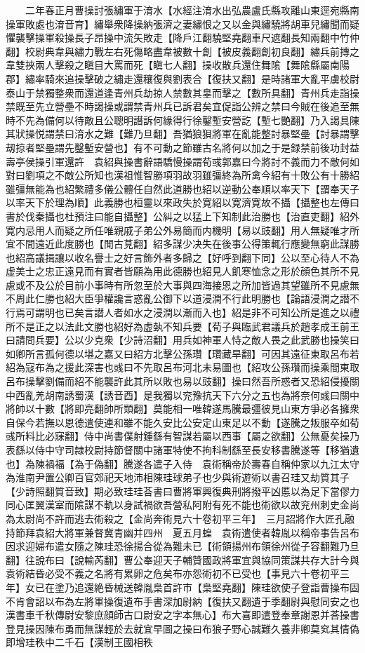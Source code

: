 　　二年春正月曹操討張繡軍于淯水【水經注淯水出弘農盧氏縣攻離山東逕宛縣南操軍敗處也淯音育】繡舉衆降操納張濟之妻繡恨之又以金與繡驍將胡車兒繡聞而疑懼襲擊操軍殺操長子昂操中流矢敗走【降戶江翻驍堅堯翻車尺遮翻長知兩翻中竹仲翻】校尉典韋與繡力戰左右死傷略盡韋被數十創【被皮義翻創初良翻】繡兵前摶之韋雙挾兩人擊殺之瞋目大罵而死【瞋七人翻】操收散兵還住舞隂【舞隂縣屬南陽郡】繡率騎來追操擊破之繡走還穰復與劉表合【復扶又翻】是時諸軍大亂平虜校尉泰山于禁獨整衆而還道逢青州兵劫掠人禁數其辠而擊之【數所具翻】青州兵走詣操禁既至先立營壘不時謁操或謂禁青州兵已訴君矣宜促詣公辨之禁曰今賊在後追至無時不先為備何以待敵且公聰明譖訴何緣得行徐鑿塹安營訖【塹七艷翻】乃入謁具陳其狀操悦謂禁曰淯水之難【難乃旦翻】吾猶狼狽將軍在亂能整討暴堅壘【討暴謂擊刼掠者堅壘謂先鑿塹安營也】有不可動之節雖古名將何以加之于是録禁前後功封益壽亭侯操引軍還許　袁紹與操書辭語驕慢操謂荀彧郭嘉曰今將討不義而力不敵何如對曰劉項之不敵公所知也漢祖惟智勝項羽故羽雖彊終為所禽今紹有十敗公有十勝紹雖彊無能為也紹繁禮多儀公體任自然此道勝也紹以逆動公奉順以率天下【謂奉天子以率天下於理為順】此義勝也桓靈以來政失於寛紹以寛濟寛故不攝【攝整也左傳曰書於伐秦攝也杜預注曰能自攝整】公糾之以猛上下知制此治勝也【治直吏翻】紹外寛内忌用人而疑之所任唯親戚子弟公外易簡而内機明【易以豉翻】用人無疑唯才所宜不間遠近此度勝也【閒古莧翻】紹多謀少决失在後事公得策輒行應變無窮此謀勝也紹高議揖讓以收名譽士之好言飾外者多歸之【好呼到翻下同】公以至心待人不為虚美士之忠正遠見而有實者皆願為用此德勝也紹見人飢寒恤念之形於顔色其所不見慮或不及公於目前小事時有所忽至於大事與四海接恩之所加皆過其望雖所不見慮無不周此仁勝也紹大臣爭權讒言惑亂公御下以道浸潤不行此明勝也【論語浸潤之譛不行焉可謂明也已矣言譛人者如水之浸潤以漸而入也】紹是非不可知公所是進之以禮所不是正之以法此文勝也紹好為虚埶不知兵要【荀子與臨武君議兵於趙孝成王前王曰請問兵要】公以少克衆【少詩沼翻】用兵如神軍人恃之敵人畏之此武勝也操笑曰如卿所言孤何德以堪之嘉又曰紹方北擊公孫瓚【瓚藏旱翻】可因其遠征東取呂布若紹為寇布為之援此深害也彧曰不先取呂布河北未易圖也【紹攻公孫瓚而操乘間東取呂布操擊劉備而紹不能襲許此其所以敗也易以豉翻】操曰然吾所惑者又恐紹侵擾關中西亂羌胡南誘蜀漢【誘音酉】是我獨以兖豫抗天下六分之五也為將奈何彧曰關中將帥以十數【將即亮翻帥所類翻】莫能相一唯韓遂馬騰最彊彼見山東方爭必各擁衆自保今若撫以恩德遣使連和雖不能久安比公安定山東足以不動【遂騰之叛服卒如荀彧所料比必寐翻】侍中尚書僕射鍾繇有智謀若屬以西事【屬之欲翻】公無憂矣操乃表繇以侍中守司隸校尉持節督關中諸軍特使不拘科制繇至長安移書騰遂等【移猶遺也】為陳禍福【為于偽翻】騰遂各遣子入侍　袁術稱帝於壽春自稱仲家以九江太守為淮南尹置公卿百官郊祀天地沛相陳珪球弟子也少與術遊術以書召珪又劫質其子【少詩照翻質音致】期必致珪珪荅書曰曹將軍興復典刑將撥平凶慝以為足下當僇力同心匡翼漢室而隂謀不軌以身試禍欲吾營私阿附有死不能也術欲以故兖州刺史金尚為太尉尚不許而逃去術殺之【金尚奔術見六十卷初平三年】　三月詔將作大匠孔融持節拜袁紹大將軍兼督冀青幽并四州　夏五月蝗　袁術遣使者韓胤以稱帝事告呂布因求迎婦布遣女隨之陳珪恐徐揚合從為難未已【術領揚州布領徐州從子容翻難乃旦翻】往說布曰【說輸芮翻】曹公奉迎天子輔贊國政將軍宜與協同策謀共存大計今與袁術結昏必受不義之名將有累卵之危矣布亦怨術初不已受也【事見六十卷初平三年】女已在塗乃追還絶昏械送韓胤梟首許市【梟堅堯翻】陳珪欲使子登詣曹操布固不肯會詔以布為左將軍操復遺布手書深加尉納【復扶又翻遺于季翻尉與慰同安之也漢書車千秋傳尉安黎庶顔師古口尉安之字本無心】布大喜即遣登奉章謝恩并荅操書登見操因陳布勇而無謀輕於去就宜早圖之操曰布狼子野心誠難久養非卿莫䆒其情偽即增珪秩中二千石【漢制王國相秩